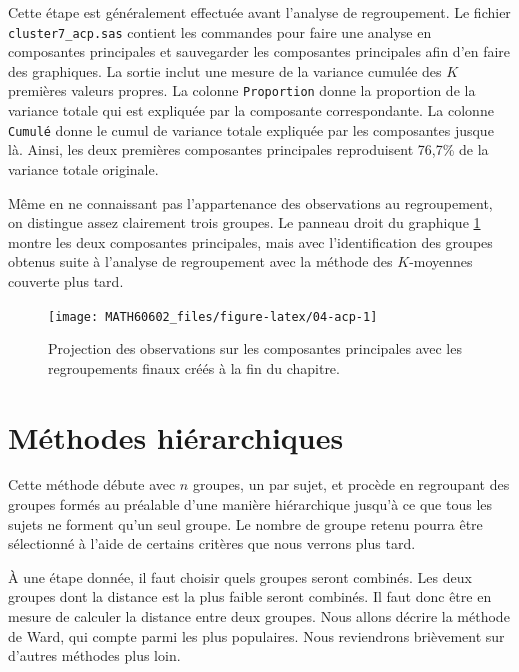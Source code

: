 \documentclass[
  11pt,
  letterpaper,
]{book}
\theoremstyle{definition}
\theoremstyle{definition}
\theoremstyle{definition}
\theoremstyle{definition}
\theoremstyle{remark}
\begin{document}
Cette étape est généralement effectuée avant l'analyse de regroupement.
Le fichier \texttt{cluster7\_acp.sas} contient les commandes pour faire une analyse en composantes principales et sauvegarder les composantes principales afin d'en faire des graphiques. La sortie inclut une mesure de la variance cumulée des \(K\) premières valeurs propres. La colonne \texttt{Proportion} donne la proportion de la variance totale qui est expliquée par la composante correspondante. La colonne \texttt{Cumulé} donne le cumul de variance totale expliquée par les composantes jusque là. Ainsi, les deux premières composantes principales reproduisent 76,7\% de la variance totale originale.

Même en ne connaissant pas l'appartenance des observations au regroupement, on distingue assez clairement trois groupes. Le panneau droit du graphique \ref{fig:04-acp} montre les deux composantes principales, mais avec l'identification des groupes obtenus suite à l'analyse de regroupement avec la méthode des \(K\)-moyennes couverte plus tard.

\begin{figure}

{\centering \texttt{[image: MATH60602\_files/figure-latex/04-acp-1]} 

}

\caption{Projection des observations sur les composantes principales avec les regroupements finaux créés à la fin du chapitre.}\label{fig:04-acp}
\end{figure}

\hypertarget{muxe9thodes-hiuxe9rarchiques}{%
\section{Méthodes hiérarchiques}\label{muxe9thodes-hiuxe9rarchiques}}

Cette méthode débute avec \(n\) groupes, un par sujet, et procède en regroupant des groupes formés au préalable d'une manière hiérarchique jusqu'à ce que tous les sujets ne forment qu'un seul groupe. Le nombre de groupe retenu pourra être sélectionné à l'aide de certains critères que nous verrons plus tard.

À une étape donnée, il faut choisir quels groupes seront combinés. Les deux groupes dont la distance est la plus faible seront combinés. Il faut donc être en mesure de calculer la distance entre deux groupes. Nous allons décrire la méthode de Ward, qui compte parmi les plus populaires. Nous reviendrons brièvement sur d'autres méthodes plus loin.
\end{document}

